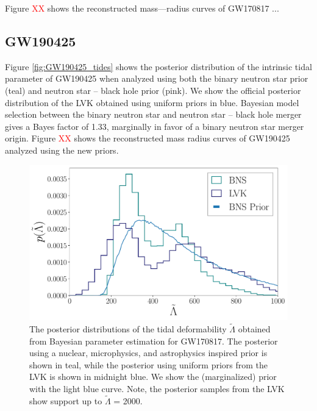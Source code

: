\documentclass[twocolumn]{aastex631}
\newcommand{\red}[1]{\textcolor{red}{#1}}
\begin{document}
	Figure \red{XX} shows the reconstructed mass---radius curves of GW170817 ... 
	\subsection{GW190425}
	Figure \ref{fig:GW190425_tides} shows the posterior distribution of the intrinsic tidal parameter of GW190425 when analyzed using both the binary neutron star prior (teal) and neutron star -- black hole prior (pink). We show the official posterior distribution  of the LVK obtained using uniform priors in blue. 
	Bayesian model selection between the binary neutron star and neutron star -- black hole merger gives a Bayes factor of 1.33, marginally in favor of a binary neutron star merger origin. 
	Figure \red{XX} shows the reconstructed mass radius curves of GW190425 analyzed using the new priors.  
	\begin{figure}
		\centering
		\includegraphics[width=1.\linewidth]{Fig_2_GW170817_lambda_tilde_posteriors_BNS.pdf}
		\caption{The posterior distributions of the tidal deformability $\tilde{\Lambda}$ obtained from Bayesian parameter estimation for GW170817. The posterior using a nuclear, microphysics, and astrophysics inspired prior is shown in teal, while the posterior using uniform priors from the LVK is shown in midnight blue. We show the (marginalized) prior with the light blue curve. Note, the posterior samples from the LVK show support up to $\tilde{\Lambda}$ = 2000. }
		\label{fig:GW170817_tides}
	\end{figure}
	
\end{document}
